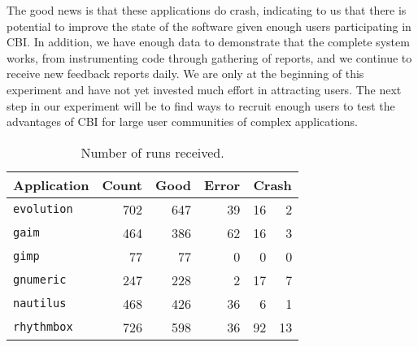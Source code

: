 \documentclass[10pt,twocolumn]{article}
\newcommand{\evolution}{\texttt{evolution}\xspace}
\newcommand{\gaim}{\texttt{gaim}\xspace}
\newcommand{\gimp}{\texttt{gimp}\xspace}
\newcommand{\gnumeric}{\texttt{gnumeric}\xspace}
\newcommand{\nautilus}{\texttt{nautilus}\xspace}
\newcommand{\rhythmbox}{\texttt{rhythmbox}\xspace}
\newcommand{\header}[1]{\multicolumn{1}{c}{\textbf{#1}}}
\begin{document}
The good news is that these applications do crash,
indicating to us that there is potential to improve the state
of the software given enough users participating in CBI.  In addition,
we have enough data to demonstrate that the complete system works, from
instrumenting code through gathering of reports, and we continue to
receive new feedback reports daily.  We are only at the beginning of this
experiment and have not yet invested much effort in attracting users. 
The next step in our experiment will be
to find ways to recruit enough users to test the advantages of CBI
for large user communities of complex applications.


\begin{table}
  \centering
  \begin{tabular}{lrrrr@{ (}r@{\%)}}
    \header{Application} & \header{Count} & \header{Good} & \header{Error} & \multicolumn{2}{c}{\textbf{Crash}} \\ \hline
    \evolution & 702 & 647 & 39 & 16 & 2 \\
    \gaim & 464 & 386 & 62 & 16 & 3 \\
    \gimp & 77 & 77 & 0 & 0 & 0 \\
    \gnumeric & 247 & 228 & 2 & 17 & 7 \\
    \nautilus & 468 & 426 & 36 & 6 & 1 \\
    \rhythmbox & 726 & 598 & 36 & 92 & 13
  \end{tabular}
  \caption{Number of runs received.}
  \label{reports-per-app}
\end{table}


\end{document}

